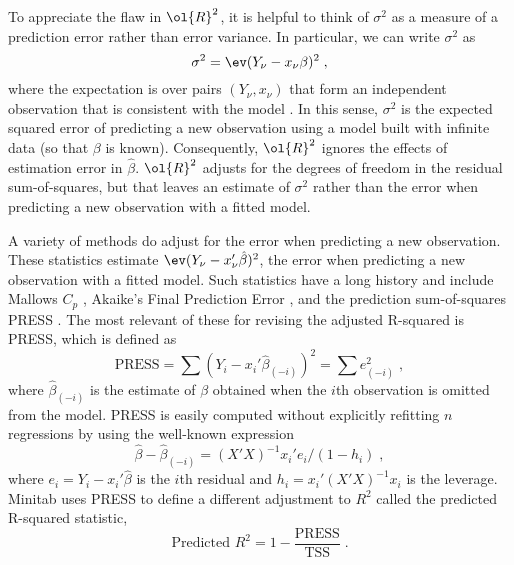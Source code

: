 \documentclass[12pt]{article}
\newcommand{\ars}{\mbox{$\ol{R}^2$}}
\begin{document}
To appreciate the flaw in $\ars$, it is helpful to think of $\sigma^2$ as a measure of a prediction error rather than error variance.  In particular, we can write $\sigma^2$ as
 \begin{equation}
     \sigma^2 = \ev (Y_\nu - x_\nu \beta)^2  \;,
 \end{equation}
where the expectation is over pairs $(Y_\nu, x_\nu)$ that form an independent observation that is consistent with the model .  In this sense, $\sigma^2$ is the expected squared error of predicting a new observation using a model built with infinite data (so that $\beta$ is known).  Consequently, $\ars$ ignores the effects of estimation error in $\hat\beta$.  $\ars$ adjusts for the degrees of freedom in the residual sum-of-squares, but that leaves an estimate of $\sigma^2$ rather than the error when predicting a new observation with a fitted model. 


  A variety of methods do adjust for the error when predicting a new observation. These statistics estimate $\ev(Y_\nu - x_\nu'\hat\beta)^2$, the error when predicting a new observation with a fitted model.  Such statistics have a long history and include Mallows $C_p$ \citep{mallows73}, Akaike's Final Prediction Error \citep{akaike69}, and the prediction sum-of-squares PRESS \citep{allen74}.  The most relevant of these for revising the adjusted R-squared is PRESS, which is defined as
  \begin{equation}
     \mbox{PRESS} = \sum(Y_i - x_i'\hat\beta_{(-i)})^2 = \sum e_{(-i)}^2  \;,
 \label{eq:press}
  \end{equation}
where $\hat\beta_{(-i)}$ is the estimate of $\beta$ obtained when the $i$th observation is omitted from the model.  PRESS is easily computed without explicitly refitting $n$ regressions by using the well-known expression \citep[\eg][]{belsley80,tarpey00}
\begin{equation}
  \hat\beta - \hat\beta_{(-i)} = (X'X)^{-1} x_i'e_i/(1-h_i) \;,
 \label{eq:cv}
 \end{equation}
where $e_i = Y_i - x_i'\hat\beta$ is the $i$th residual and $h_i = x_i'(X'X)^{-1}x_i$ is the leverage.  Minitab uses PRESS to define a different adjustment to $R^2$ called the predicted R-squared statistic,
\begin{equation}
  \mbox{Predicted } R^2 = 1 - \frac{\mbox{PRESS}}{\mbox{TSS}}  \;.
\end{equation}
\end{document}
